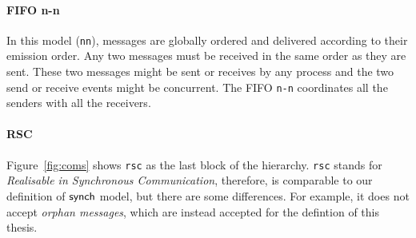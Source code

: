 
\paragraph{FIFO n-n}
In this model (\verb|nn|), messages are globally ordered and delivered according to 
their emission order. Any two messages must be received in the same order 
as they are sent. These two messages might be sent or receives by any process 
and the two send or receive events might be concurrent. The FIFO \verb|n-n| 
coordinates all the senders with all the receivers.

\paragraph{RSC}
Figure~\ref{fig:coms} shows \verb|rsc| as the last block of the hierarchy.
\verb|rsc| stands for \emph{Realisable in Synchronous Communication}, therefore, 
is comparable to our definition of $\mathsf{synch}$ model, but there are 
some differences. For example, it does not accept \emph{orphan messages}, 
which are instead accepted for the defintion of this thesis.




